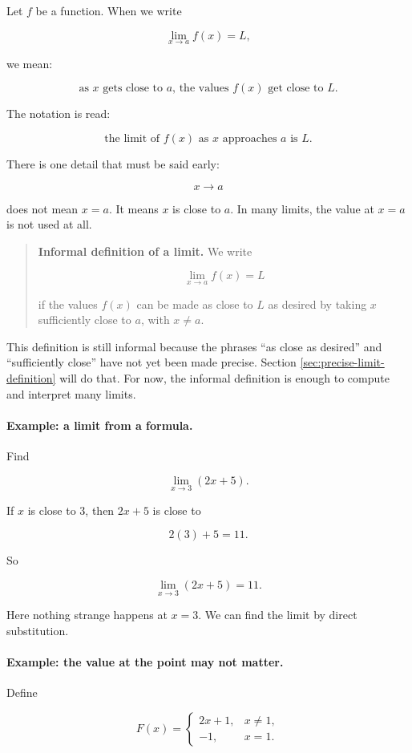 Let \(f\) be a function.  When we write

\[
\lim_{x\to a} f(x)=L,
\]

we mean:

\[
\text{as \(x\) gets close to \(a\), the values \(f(x)\) get close to \(L\).}
\]

The notation is read:

\[
\text{the limit of \(f(x)\) as \(x\) approaches \(a\) is \(L\).}
\]

There is one detail that must be said early:

\[
x\to a
\]

does not mean \(x=a\).  It means \(x\) is close to \(a\).  In many limits, the value at \(x=a\) is not used at all.

\begin{quote}
\textbf{Informal definition of a limit.}
We write

\[
\lim_{x\to a} f(x)=L
\]

if the values \(f(x)\) can be made as close to \(L\) as desired by taking \(x\) sufficiently close to \(a\), with \(x\neq a\).
\end{quote}

This definition is still informal because the phrases ``as close as desired'' and ``sufficiently close'' have not yet been made precise.  Section \ref{sec:precise-limit-definition} will do that.  For now, the informal definition is enough to compute and interpret many limits.

\paragraph{Example: a limit from a formula.}
Find

\[
\lim_{x\to 3}(2x+5).
\]

If \(x\) is close to \(3\), then \(2x+5\) is close to

\[
2(3)+5=11.
\]

So

\[
\lim_{x\to 3}(2x+5)=11.
\]

Here nothing strange happens at \(x=3\).  We can find the limit by direct substitution.

\paragraph{Example: the value at the point may not matter.}
Define

\[
F(x)=
\begin{cases}
2x+1, & x\neq1,\\
-1, & x=1.
\end{cases}
\]

